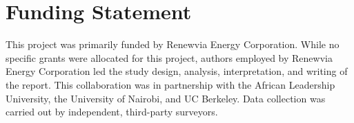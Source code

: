 \section*{Funding Statement}
This project was primarily funded by Renewvia Energy Corporation. While no specific grants were allocated for this project, authors employed by Renewvia Energy Corporation led the study design, analysis, interpretation, and writing of the report. This collaboration was in partnership with the African Leadership University, the University of Nairobi, and UC Berkeley. Data collection was carried out by independent, third-party surveyors.